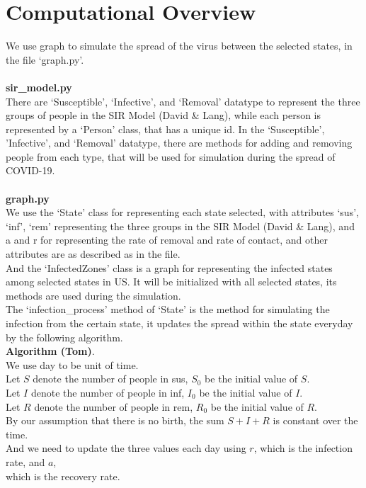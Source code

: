 \documentclass[12pt]{article}
\begin{document}
\section{Computational Overview}
We use graph to simulate the spread of the virus between the selected states, in the file `graph.py'.\\\\
\textbf{sir\_model.py}\\
There are `Susceptible', `Infective', and `Removal' datatype to represent the three groups of people in the SIR Model (David \& Lang), while each person is represented by a `Person' class, that has a unique id. In the `Susceptible', 'Infective', and `Removal' datatype, there are methods for adding and removing people from each type, that will be used for simulation during the spread of COVID-19.\\\\
\textbf{graph.py} \\
We use the `State' class for representing each state selected, with attributes `sus', `inf', `rem' representing the three groups in the SIR Model (David \& Lang), and a and r for representing the rate of removal and rate of contact, and other attributes are as described as in the file.\\
And the `InfectedZones' class is a graph for representing the infected states among selected states in US. It will be initialized with all selected states, its methods are used during the simulation.\\
The `infection\_process' method of `State' is the method for simulating the infection from the certain state, it updates the spread within the state everyday by the following algorithm.\\
\newcommand{\n}{\hspace*{5mm}}
\n \textbf{Algorithm (Tom)}.\\
\n We use day to be unit of time.\\
\n Let $S$ denote the number of people in sus, $S_0$ be the initial value of $S$.\\
\n Let $I$ denote the number of people in inf, $I_0$ be the initial value of $I$.\\
\n Let $R$ denote the number of people in rem, $R_0$ be the initial value of $R$.\\
\n By our assumption that there is no birth, the sum $S+I+R$ is constant over the \\\n time.\\
\n And we need to update the three values each day using $r$, which is the infection rate, and $a$, \\\n which is the recovery rate.\\
\end{document}

